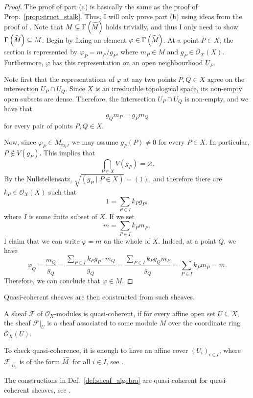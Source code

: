 \begin{proof}
  The proof of part (a) is basically the same as the proof of
  Prop.~\ref{prop:struct_stalk}. Thus, I will only prove part (b) using
  ideas from the proof of \cite[Proposition 3.8]{gathmann_new}. Note
  that $M\subseteq\Gamma\left(\widetilde{M}\right)$ holds trivially, and thus I
  only need to show $\Gamma\left(\widetilde{M}\right)\subseteq M$.
  Begin by fixing an element $\varphi\in\Gamma\left(\widetilde{M}\right)$.
  At a point $P\in X$, the section is represented by
  $\varphi_P=m_P/g_P$, where $m_P\in M$ and $g_P\in\mathscr{O}_X(X)$.
  Furthermore, $\varphi$ has this representation on an open neighbourhood $U_P$.
  
  Note first that the representations of $\varphi$ at
  any two points $P,Q\in X$ agree on the intersection
  $U_P\cap U_Q$. Since $X$ is an irreducible topological space,
  its non-empty open subsets are dense. Therefore, the
  intersection $U_P\cap U_Q$ is non-empty, and we have that
  \[g_Qm_P=g_Pm_Q\]
  for every pair of points $P,Q\in X$.

  Now, since $\varphi_P\in M_{\mathfrak{m}_P}$, we may assume $g_P(P)\neq 0$ for every $P\in X$.
  In particular, $P\not\in V(g_P)$. This implies that
  \[
    \bigcap_{P\in X}V(g_P)=\varnothing.
  \]
  By the Nullstellensatz, $\sqrt{(g_P\mid P\in X)}=(1)$, and therefore
  there are $k_P\in\mathscr{O}_X(X)$ such that
  \[1=\sum_{P\in I}k_Pg_P,\]
  where $I$ is some finite subset of $X$.
  If we set
  \[m=\sum_{P\in I}k_Pm_P,\]
  I claim that we can write $\varphi=m$ on the whole of $X$.
  Indeed, at a point $Q$, we have
  \[\varphi_Q=\frac{m_Q}{g_Q}=\frac{\sum_{P\in I}k_Pg_P\cdot m_Q}{g_Q}=\frac{\sum_{P\in I}k_Pg_Qm_P}{g_Q}=\sum_{P\in I}k_Pm_P=m.\]
  Therefore, we can conclude that $\varphi\in M$.
\end{proof}
Quasi-coherent sheaves are then constructed from such sheaves.
\begin{defin}
  A sheaf $\mathscr{F}$ of $\mathscr{O}_{X}$-modules is quasi-coherent, if
  for every affine open set $U\subseteq X$, the sheaf $\mathscr{F}\vert_{U}$
  is a sheaf associated to some module $M$ over the coordinate ring
  $\mathscr{O}_{X}(U)$.
\end{defin}
\begin{rem}
  To check quasi-coherence, it is enough to have an affine cover
  $(U_{i})_{i\in I}$, where $\mathscr{F}\vert_{U_{i}}$ is of the form $\widetilde{M}$ for
  all $i\in I$, see \cite{gathmann}.
\end{rem}
\begin{rem}
  The constructions in Def.~\ref{def:sheaf_algebra} are quasi-coherent
  for quasi-coherent sheaves, see \cite{gathmann}.
\end{rem}
